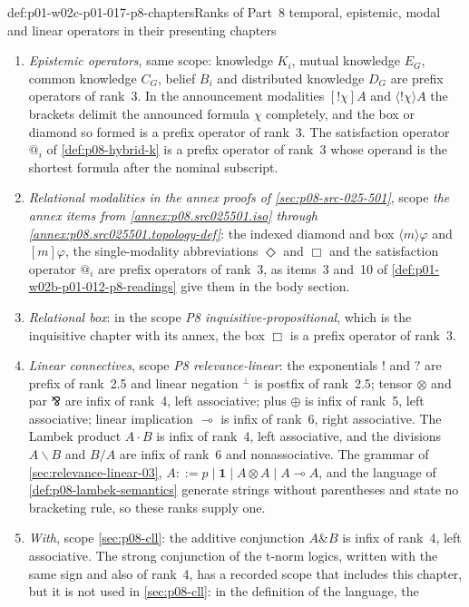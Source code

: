 \begin{hbconvention}{def:p01-w02c-p01-017-p8-chapters}{Ranks of Part~8 temporal, epistemic, modal and linear operators in their presenting chapters}
\begin{enumerate}
\item \emph{Epistemic operators}, same scope: knowledge \(K_i\),
  mutual knowledge \(E_G\), common knowledge \(C_G\), belief \(B_i\) and
  distributed knowledge \(D_G\) are prefix operators of rank~3.  In the
  announcement modalities \([!\chi]A\) and \(\langle!\chi\rangle A\) the
  brackets delimit the announced formula \(\chi\) completely, and the box
  or diamond so formed is a prefix operator of rank~3.  The satisfaction
  operator \(@_i\) of \cref{def:p08-hybrid-k} is a prefix operator of
  rank~3 whose operand is the shortest formula after the nominal
  subscript.
\item \emph{Relational modalities in the annex proofs of
  \cref{sec:p08-src-025-501}}, scope \emph{the annex items from
  \cref{annex:p08.src025501.iso} through
  \cref{annex:p08.src025501.topology-def}}: the indexed diamond and box
  \(\langle m\rangle\varphi\) and \([m]\varphi\), the single-modality
  abbreviations \(\Diamond\) and \(\Box\) and the satisfaction operator
  \(@_i\) are prefix operators of rank~3, as items~3 and~10 of
  \cref{def:p01-w02b-p01-012-p8-readings} give them in the body section.
\item \emph{Relational box}: in the scope \emph{P8
  inquisitive-propositional}, which is the inquisitive chapter with its
  annex, the box \(\Box\) is a prefix operator of rank~3.
\item \emph{Linear connectives}, scope \emph{P8 relevance-linear}: the
  exponentials \(!\) and \(?\) are prefix of rank~2.5 and linear
  negation \({}^\perp\) is postfix of rank~2.5; tensor \(\otimes\) and
  par \(\bindnasrepma\) are infix of rank~4, left associative; plus
  \(\oplus\) is infix of rank~5, left associative; linear implication
  \(\multimap\) is infix of rank~6, right associative.  The Lambek
  product \(A\mathbin{\cdot}B\) is infix of rank~4, left associative, and
  the divisions \(A\backslash B\) and \(B/A\) are infix of rank~6 and
  nonassociative.  The grammar of \cref{sec:relevance-linear-03},
  \(A::=p\mid\mathbf 1\mid A\otimes A\mid A\multimap A\), and the language
  of \cref{def:p08-lambek-semantics} generate strings without
  parentheses and state no bracketing rule, so these ranks supply one.
\item \emph{With}, scope \cref{sec:p08-cll}: the additive conjunction
  \(A\mathbin{\&}B\) is infix of rank~4, left associative.  The strong
  conjunction of the t-norm logics, written with the same sign and also
  of rank~4, has a recorded scope that includes this chapter, but it is
  not used in \cref{sec:p08-cll}: in the definition of the language, the

\end{enumerate}
\end{hbconvention}
